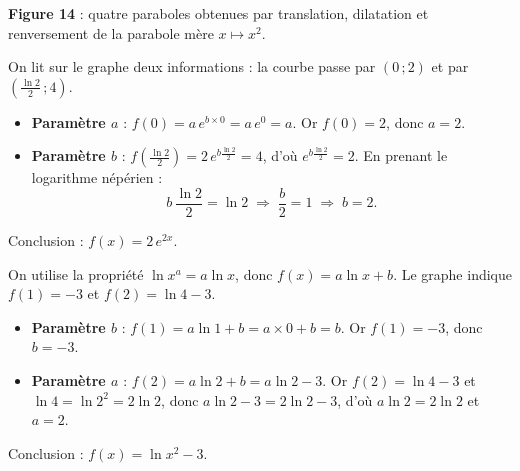 \documentclass[11pt,a4paper]{article}
\begin{document}
\begin{center}
\textbf{\textcolor{primary}{Figure 14}} : quatre paraboles obtenues par translation,
dilatation et renversement de la parabole mère $x\mapsto x^2$.
\end{center}

\begin{exemple}[Retrouver les paramètres de $f(x)=a\,e^{bx}$ sur un graphe]
On lit sur le graphe deux informations : la courbe passe par $(0\,;2)$ et par
$\left(\tfrac{\ln 2}{2}\,;4\right)$.
\begin{itemize}[leftmargin=1.5em,topsep=2pt]
  \item \textbf{Paramètre $a$} : $f(0)=a\,e^{b\times 0}=a\,e^0=a$. Or $f(0)=2$, donc
        $\boxed{a=2}$.
  \item \textbf{Paramètre $b$} : $f\!\left(\tfrac{\ln 2}{2}\right)=2\,e^{b\frac{\ln 2}{2}}=4$,
        d'où $e^{b\frac{\ln 2}{2}}=2$. En prenant le logarithme népérien :
        \[
          b\,\frac{\ln 2}{2}=\ln 2 \;\Longrightarrow\; \frac{b}{2}=1 \;\Longrightarrow\; \boxed{b=2}.
        \]
\end{itemize}
Conclusion : $f(x)=2\,e^{2x}$.
\end{exemple}

\begin{exemple}[Retrouver les paramètres de $f(x)=\ln x^{a}+b$ sur un graphe]
On utilise la propriété $\ln x^a=a\ln x$, donc $f(x)=a\ln x+b$. Le graphe indique
$f(1)=-3$ et $f(2)=\ln 4-3$.
\begin{itemize}[leftmargin=1.5em,topsep=2pt]
  \item \textbf{Paramètre $b$} : $f(1)=a\ln 1+b=a\times 0+b=b$. Or $f(1)=-3$, donc
        $\boxed{b=-3}$.
  \item \textbf{Paramètre $a$} : $f(2)=a\ln 2+b=a\ln 2-3$. Or $f(2)=\ln 4-3$ et
        $\ln 4=\ln 2^2=2\ln 2$, donc $a\ln 2-3=2\ln 2-3$, d'où $a\ln 2=2\ln 2$ et
        $\boxed{a=2}$.
\end{itemize}
Conclusion : $f(x)=\ln x^{2}-3$.
\end{exemple}
\end{document}
